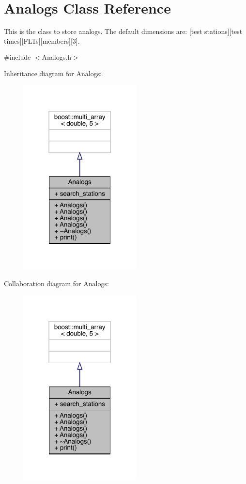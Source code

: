 \hypertarget{class_analogs}{}\section{Analogs Class Reference}
\label{class_analogs}


This is the class to store analogs. The default dimensions are\+: \mbox{[}test stations\mbox{]}\mbox{[}test times\mbox{]}\mbox{[}F\+L\+Ts\mbox{]}\mbox{[}members\mbox{]}\mbox{[}3\mbox{]}.  




{\ttfamily \#include $<$Analogs.\+h$>$}



Inheritance diagram for Analogs\+:
\nopagebreak
\begin{figure}[H]
\begin{center}
\leavevmode
\includegraphics[width=175pt]{class_analogs__inherit__graph}
\end{center}
\end{figure}


Collaboration diagram for Analogs\+:
\nopagebreak
\begin{figure}[H]
\begin{center}
\leavevmode
\includegraphics[width=175pt]{class_analogs__coll__graph}
\end{center}
\end{figure}
